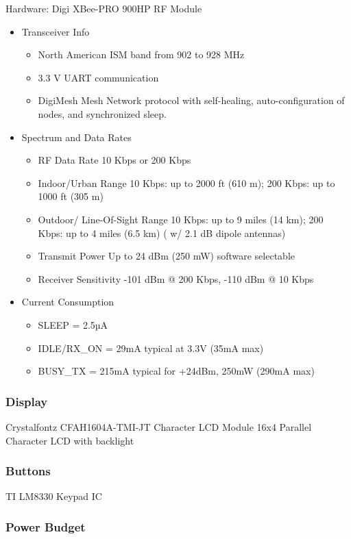 \documentclass[journal]{IEEEtran}
\begin{document}
Hardware: Digi XBee-PRO 900HP RF Module
\begin{itemize}
  \item Transceiver Info
    \begin{itemize}
      \item North American ISM band from 902 to 928 MHz
      \item 3.3 V UART communication
      \item DigiMesh Mesh Network protocol with self-healing, auto-configuration of nodes, and synchronized sleep.
    \end{itemize}
  \item Spectrum and Data Rates
    \begin{itemize}
      \item RF Data Rate  10 Kbps or 200 Kbps
      \item Indoor/Urban Range  10 Kbps: up to 2000 ft (610 m); 200 Kbps: up to 1000 ft (305 m)
      \item Outdoor/ Line-Of-Sight Range  10 Kbps: up to 9 miles (14 km); 200 Kbps: up to 4 miles (6.5 km) ( w/ 2.1 dB dipole antennas)
      \item Transmit Power  Up to 24 dBm (250 mW) software selectable
      \item Receiver Sensitivity  -101 dBm @ 200 Kbps, -110 dBm @ 10 Kbps
    \end{itemize}
  \item Current Consumption
    \begin{itemize}
      \item SLEEP = 2.5µA
      \item IDLE/RX\_ON = 29mA typical at 3.3V (35mA max)
      \item BUSY\_TX = 215mA typical for +24dBm, 250mW (290mA max)
    \end{itemize}
\end{itemize}

\subsubsection{Display}
Crystalfontz CFAH1604A-TMI-JT Character LCD Module
16x4 Parallel Character LCD with backlight

\subsubsection{Buttons}
TI LM8330 Keypad IC

\subsubsection{Power Budget}
\end{document}
